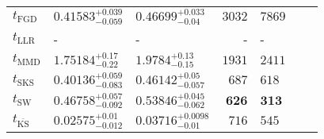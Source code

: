 \begin{tabular}{l|llr|llr}
	\midrule
	$t_{\mathrm{FGD}}$ & $0.41583_{-0.059}^{+0.039}$ & $0.46699_{-0.04}^{+0.033}$ & $3032$ & $7869$ \\
	$t_{\mathrm{LLR}}$ & - & - & - & - \\
	$t_{\mathrm{MMD}}$ & $1.75184_{-0.22}^{+0.17}$ & $1.9784_{-0.15}^{+0.13}$ & $1931$ & $2411$ \\
	$t_{\mathrm{SKS}}$ & $0.40136_{-0.083}^{+0.059}$ & $0.46142_{-0.057}^{+0.05}$ & $687$ & $618$ \\
	$t_{\mathrm{SW}}$ & $0.46758_{-0.092}^{+0.057}$ & $0.53846_{-0.062}^{+0.045}$ & ${\mathbf{626}}$ & ${\mathbf{313}}$ \\
	$t_{\overline{\mathrm{KS}}}$ & ${\mathbf{0.02575_{-0.012}^{+0.01}}}$ & ${\mathbf{0.03716_{-0.01}^{+0.0098}}}$ & $716$ & $545$ \\
	\bottomrule
\end{tabular}